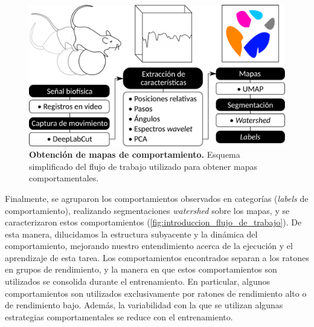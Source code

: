 \clearpage

\begin{figure}[htbp]
  \centering
  \includegraphics[width=0.85\linewidth]{figuras/introduccion/flujo_de_trabajo.pdf}
  \caption{\textbf{Obtención de mapas de comportamiento.} Esquema simplificado del flujo de trabajo utilizado para obtener mapas comportamentales.}
  \label{fig:introduccion_flujo_de_trabajo}
\end{figure}

Finalmente, se agruparon los comportamientos observados en categorías (\textit{labels} de comportamiento), realizando segmentaciones \textit{watershed} sobre los mapas, y se caracterizaron estos comportamientos (\autoref{fig:introduccion_flujo_de_trabajo}). De esta manera, dilucidamos la estructura subyacente y la dinámica del comportamiento, mejorando nuestro entendimiento acerca de la ejecución y el aprendizaje de esta tarea. Los comportamientos encontrados separan a los ratones en grupos de rendimiento, y la manera en que estos comportamientos son utilizados se consolida durante el entrenamiento. En particular, algunos comportamientos son utilizados exclusivamente por ratones de rendimiento alto o de rendimiento bajo. Además, la variabilidad con la que se utilizan algunas estrategias comportamentales se reduce con el entrenamiento.